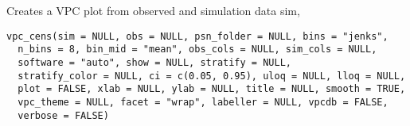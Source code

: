 \documentclass[letterpaper]{book}
\begin{document}
%
\begin{Description}\relax
Creates a VPC plot from observed and simulation data
sim,
\end{Description}
%
\begin{Usage}
\begin{verbatim}
vpc_cens(sim = NULL, obs = NULL, psn_folder = NULL, bins = "jenks",
  n_bins = 8, bin_mid = "mean", obs_cols = NULL, sim_cols = NULL,
  software = "auto", show = NULL, stratify = NULL,
  stratify_color = NULL, ci = c(0.05, 0.95), uloq = NULL, lloq = NULL,
  plot = FALSE, xlab = NULL, ylab = NULL, title = NULL, smooth = TRUE,
  vpc_theme = NULL, facet = "wrap", labeller = NULL, vpcdb = FALSE,
  verbose = FALSE)
\end{verbatim}
\end{Usage}
%
\end{document}

